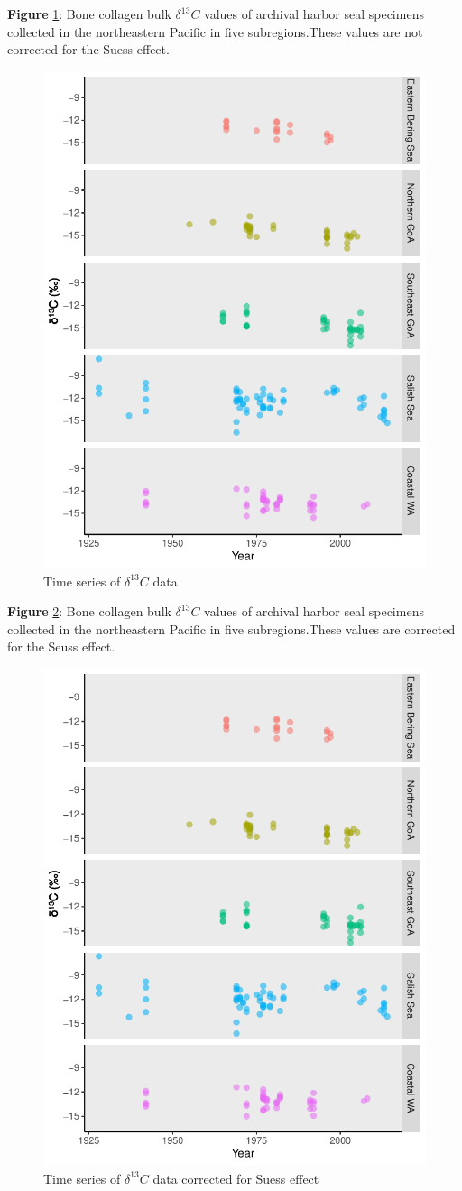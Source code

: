 \documentclass [11pt, proquest] {uwthesis}[2015/03/03]
\begin{document}
\textbf{Figure} \ref{fig:nonSuess}: Bone collagen bulk \(\delta^{13}C\)
values of archival harbor seal specimens collected in the northeastern
Pacific in five subregions.These values are not corrected for the Suess
effect. \newline 
\begin{figure}[h]
\centering
  \includegraphics[height=0.8\textwidth]{figure/Ch2/FigureS4.pdf}
  \caption{Time series of $\delta^{13}C$ data}
  \label{fig:nonSuess}
\end{figure}
\clearpage

\textbf{Figure} \ref{fig:Suess}: Bone collagen bulk \(\delta^{13}C\)
values of archival harbor seal specimens collected in the northeastern
Pacific in five subregions.These values are corrected for the Seuss
effect. \newline 
\begin{figure}[h]
\centering
  \includegraphics[height=0.8\textwidth]{figure/Ch2/FigureS5.pdf}
  \caption{Time series of $\delta^{13}C$ data corrected for Suess effect}
  \label{fig:Suess}
\end{figure}
\clearpage
\end{document}
